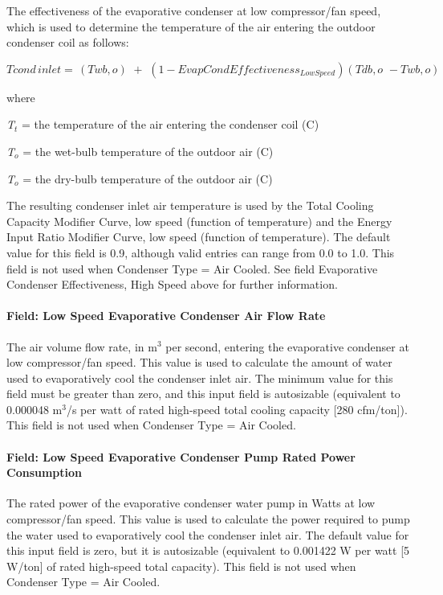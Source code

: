 The effectiveness of the evaporative condenser at low compressor/fan speed, which is used to determine the temperature of the air entering the outdoor condenser coil as follows:

\begin{equation}
Tcond\,inlet = \,\left( {Twb,o} \right)\,\, + \,\,\left( {1 - EvapCondEffectivenes{s_{LowSpeed}}} \right)\left( {Tdb,o\,\, - Twb,o} \right)
\end{equation}

where

\emph{T\(_{t}\)} = the temperature of the air entering the condenser coil (C)

\emph{T\(_{o}\)} = the wet-bulb temperature of the outdoor air (C)

\emph{T\(_{o}\)} = the dry-bulb temperature of the outdoor air (C)

The resulting condenser inlet air temperature is used by the Total Cooling Capacity Modifier Curve, low speed (function of temperature) and the Energy Input Ratio Modifier Curve, low speed (function of temperature). The default value for this field is 0.9, although valid entries can range from 0.0 to 1.0. This field is not used when Condenser Type = Air Cooled. See field Evaporative Condenser Effectiveness, High Speed above for further information.

\paragraph{Field: Low Speed Evaporative Condenser Air Flow Rate}\label{field-low-speed-evaporative-condenser-air-flow-rate}

The air volume flow rate, in m\(^{3}\) per second, entering the evaporative condenser at low compressor/fan speed. This value is used to calculate the amount of water used to evaporatively cool the condenser inlet air. The minimum value for this field must be greater than zero, and this input field is autosizable (equivalent to 0.000048 m\(^{3}\)/s per watt of rated high-speed total cooling capacity {[}280 cfm/ton{]}). This field is not used when Condenser Type = Air Cooled.

\paragraph{Field: Low Speed Evaporative Condenser Pump Rated Power Consumption}\label{field-low-speed-evaporative-condenser-pump-rated-power-consumption}

The rated power of the evaporative condenser water pump in Watts at low compressor/fan speed. This value is used to calculate the power required to pump the water used to evaporatively cool the condenser inlet air. The default value for this input field is zero, but it is autosizable (equivalent to 0.001422 W per watt {[}5 W/ton{]} of rated high-speed total capacity). This field is not used when Condenser Type = Air Cooled.

